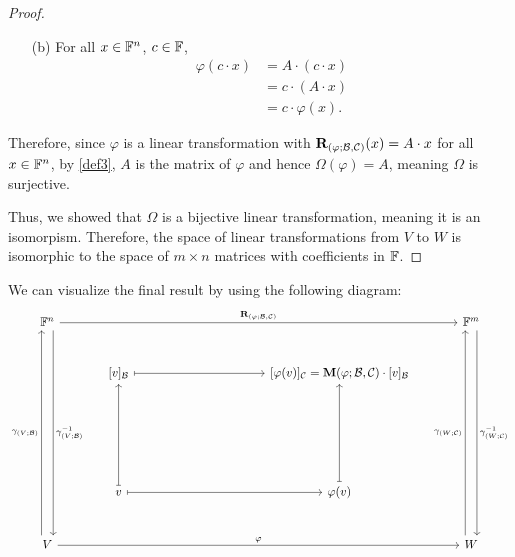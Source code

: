 \begin{proof}
\begin{enumerate}
\begin{itemize}
            \item[(b)] For all $x \in \mathbb{F}^{n}$, $c \in \mathbb{F}$,
            \begin{align*}
                \varphi(c \cdot x) &= A \cdot (c \cdot x) \\
                                   &= c \cdot (A \cdot x) \\
                                   &= c \cdot \varphi(x).
            \end{align*}
        \end{itemize}
        Therefore, since $\varphi$ is a linear transformation with
        $\mathbf{R}_{(\varphi; \mathcal{B}, \mathcal{C})}(x) = A \cdot x$ for all $x \in \mathbb{F}^{n}$,
        by \cref{def3}, $A$ is the matrix of $\varphi$ and hence
        $\Omega(\varphi) = A$, meaning $\Omega$ is surjective.
    \end{enumerate}
    Thus, we showed that $\Omega$ is a bijective linear transformation,
    meaning it is an isomorpism. Therefore, the space of linear
    transformations from $V$ to $W$ is isomorphic to the space of
    $m \times n$ matrices with coefficients in $\mathbb{F}$.
\end{proof}

We can visualize the final result by using the following diagram:
%
\[
    \begin{tikzcd}[row sep=large,column sep=large]
        \F^{n} \arrow[ddddd, "\comap{V}{\B}^{-1}", shift left=2] \arrow[rrrrr, "{\rep{\varphi}}"] &                                             &  &  &                                                            & \F^{m} \arrow[ddddd, "\comap{W}{\C}^{-1}", shift left=2] \\
                                                                                                  & \comat{v}{\B} \arrow[rrr, maps to]          &  &  & \comat{\varphi(v)}{\C} = \mat{\varphi} \cdot \comat{v}{\B} &                                                          \\
                                                                                                  &                                             &  &  &                                                            &                                                          \\
                                                                                                  &                                             &  &  &                                                            &                                                          \\
                                                                                                  & v \arrow[uuu, maps to] \arrow[rrr, maps to] &  &  & \varphi(v) \arrow[uuu, maps to]                            &                                                          \\
        V \arrow[rrrrr, "\varphi"] \arrow[uuuuu, "\comap{V}{\B}", shift left=2]                   &                                             &  &  &                                                            & W \arrow[uuuuu, "\comap{W}{\C}", shift left=2]                
    \end{tikzcd}
\]


